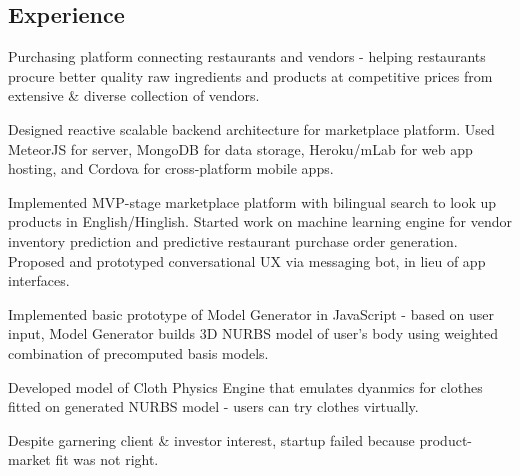\documentclass[]{deedy}
\begin{document}
\begin{minipage}[t]{0.72\textwidth}
\begin{flushleft}
\section{Experience}
%
\begin{tightemize}
\item Purchasing platform connecting restaurants and vendors - helping restaurants procure better quality raw ingredients and products at competitive prices from extensive \& diverse collection of vendors.
\item Designed reactive scalable backend architecture for marketplace platform. Used MeteorJS for server, MongoDB for data storage, Heroku/mLab for web app hosting, and Cordova for cross-platform mobile apps.
\item Implemented MVP-stage marketplace platform with bilingual search to look up products in English/Hinglish. Started work on machine learning engine for vendor inventory prediction and predictive restaurant purchase order generation. Proposed and prototyped conversational UX via messaging bot, in lieu of app interfaces.
\end{tightemize}
\sectionsep
%
\begin{tightemize}
\item Implemented basic prototype of Model Generator in JavaScript - based on user input, Model Generator builds 3D NURBS model of user's body using weighted combination of precomputed basis models.
\item Developed model of Cloth Physics Engine that emulates dyanmics for clothes fitted on generated NURBS model - users can try clothes virtually.
\item Despite garnering client \& investor interest, startup failed because product-market fit was not right.
\end{tightemize}
\sectionsep
%

\end{flushleft}
\end{minipage}
\end{document}
